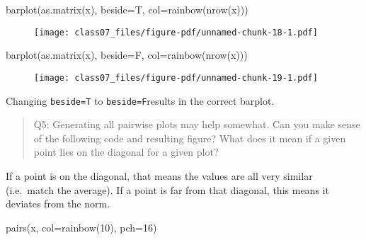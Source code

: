 \documentclass[
  letterpaper,
  DIV=11,
  numbers=noendperiod]{scrartcl}
\newenvironment{Shaded}{\begin{snugshade}}{\end{snugshade}}
\newcommand{\AttributeTok}[1]{\textcolor[rgb]{0.40,0.45,0.13}{#1}}
\newcommand{\DecValTok}[1]{\textcolor[rgb]{0.68,0.00,0.00}{#1}}
\newcommand{\FunctionTok}[1]{\textcolor[rgb]{0.28,0.35,0.67}{#1}}
\newcommand{\NormalTok}[1]{\textcolor[rgb]{0.00,0.23,0.31}{#1}}
\begin{document}
\begin{Shaded}
\begin{Highlighting}[]
\FunctionTok{barplot}\NormalTok{(}\FunctionTok{as.matrix}\NormalTok{(x), }\AttributeTok{beside=}\NormalTok{T, }\AttributeTok{col=}\FunctionTok{rainbow}\NormalTok{(}\FunctionTok{nrow}\NormalTok{(x)))}
\end{Highlighting}
\end{Shaded}

\begin{figure}[H]

{\centering \texttt{[image: class07\_files/figure-pdf/unnamed-chunk-18-1.pdf]}

}

\end{figure}

\begin{Shaded}
\begin{Highlighting}[]
\FunctionTok{barplot}\NormalTok{(}\FunctionTok{as.matrix}\NormalTok{(x), }\AttributeTok{beside=}\NormalTok{F, }\AttributeTok{col=}\FunctionTok{rainbow}\NormalTok{(}\FunctionTok{nrow}\NormalTok{(x)))}
\end{Highlighting}
\end{Shaded}

\begin{figure}[H]

{\centering \texttt{[image: class07\_files/figure-pdf/unnamed-chunk-19-1.pdf]}

}

\end{figure}

Changing \texttt{beside=T} to \texttt{beside=F}results in the correct
barplot.

\begin{quote}
Q5: Generating all pairwise plots may help somewhat. Can you make sense
of the following code and resulting figure? What does it mean if a given
point lies on the diagonal for a given plot?
\end{quote}

If a point is on the diagonal, that means the values are all very
similar (i.e.~match the average). If a point is far from that diagonal,
this means it deviates from the norm.

\begin{Shaded}
\begin{Highlighting}[]
\FunctionTok{pairs}\NormalTok{(x, }\AttributeTok{col=}\FunctionTok{rainbow}\NormalTok{(}\DecValTok{10}\NormalTok{), }\AttributeTok{pch=}\DecValTok{16}\NormalTok{)}
\end{Highlighting}
\end{Shaded}
\end{document}
